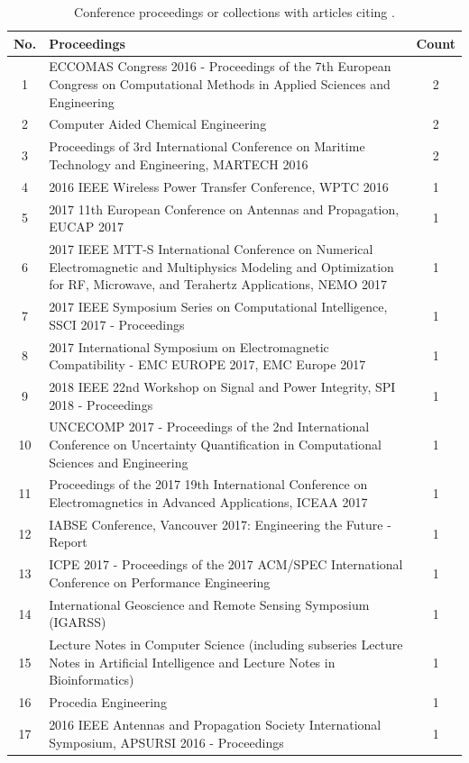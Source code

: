 \documentclass[11pt]{article}
\begin{document}
\begin{table}[!ht]
  \centering
  \caption{Conference proceedings or collections with articles citing \uqlab.}
  \label{tab:citing_conference} 
  \begin{tabularx}{\textwidth}{cXc}\toprule
    \textbf{No.} & \textbf{Proceedings} & \textbf{Count} \\\midrule
1 & ECCOMAS Congress 2016 - Proceedings of the 7th European Congress on Computational Methods in Applied Sciences and Engineering & 2\\
2 & Computer Aided Chemical Engineering & 2\\
3 & Proceedings of 3rd International Conference on Maritime Technology and Engineering, MARTECH 2016 & 2\\
4 & 2016 IEEE Wireless Power Transfer Conference, WPTC 2016 & 1\\
5 & 2017 11th European Conference on Antennas and Propagation, EUCAP 2017 & 1\\
6 & 2017 IEEE MTT-S International Conference on Numerical Electromagnetic and Multiphysics Modeling and Optimization for RF, Microwave, and Terahertz Applications, NEMO 2017 & 1\\
7 & 2017 IEEE Symposium Series on Computational Intelligence, SSCI 2017 - Proceedings & 1\\
8 & 2017 International Symposium on Electromagnetic Compatibility - EMC EUROPE 2017, EMC Europe 2017 & 1\\
9 & 2018 IEEE 22nd Workshop on Signal and Power Integrity, SPI 2018 - Proceedings & 1\\
10 & UNCECOMP 2017 - Proceedings of the 2nd International Conference on Uncertainty Quantification in Computational Sciences and Engineering & 1\\
11 & Proceedings of the 2017 19th International Conference on Electromagnetics in Advanced Applications, ICEAA 2017 & 1\\
12 & IABSE Conference, Vancouver 2017: Engineering the Future - Report & 1\\
13 & ICPE 2017 - Proceedings of the 2017 ACM/SPEC International Conference on Performance Engineering & 1\\
14 & International Geoscience and Remote Sensing Symposium (IGARSS) & 1\\
15 & Lecture Notes in Computer Science (including subseries Lecture Notes in Artificial Intelligence and Lecture Notes in Bioinformatics) & 1\\
16 & Procedia Engineering & 1\\
17 & 2016 IEEE Antennas and Propagation Society International Symposium, APSURSI 2016 - Proceedings & 1\\\bottomrule
  \end{tabularx}
\end{table}
\end{document}
